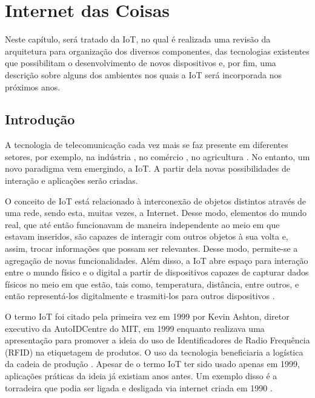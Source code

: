 \chapter{Internet das Coisas}
\label{cap:internet_of_things}

Neste capítulo, será tratado da IoT, no qual é realizada uma revisão da arquitetura para organização dos diversos componentes, das tecnologias existentes que possibilitam o desenvolvimento de novos dispositivos e, por fim, uma descrição sobre alguns dos ambientes nos quais a IoT será incorporada nos próximos anos.

\section{Introdução}

A tecnologia de telecomunicação cada vez mais se faz presente em diferentes setores, por exemplo, na indústria \cite{Fernandes2013}, no comércio \cite{Carmona2014}, no agricultura \cite{Quadros2011}. No entanto, um novo paradigma vem emergindo, a IoT. A partir dela novas possibilidades de interação e aplicações serão criadas.


O conceito de IoT está relacionado à interconexão de objetos distintos através de uma rede, sendo esta, muitas vezes, a Internet. Desse modo, elementos do mundo real, que até então funcionavam de maneira independente ao meio em que estavam inseridos, são capazes de interagir com outros objetos à sua volta e, assim, trocar informações que possam ser relevantes. Desse modo, permite-se a agregação de novas funcionalidades. Além disso, a IoT abre espaço para interação entre o mundo físico e o digital a partir de dispositivos capazes de capturar dados físicos no meio em que estão, tais como, temperatura, distância, entre outros, e então representá-los digitalmente e trasmiti-los para outros dispositivos \cite{Suresh2014}.

O termo IoT foi citado pela primeira vez em 1999 por Kevin Ashton, diretor executivo da AutoIDCentre do MIT, em 1999 enquanto realizava uma apresentação para promover a ideia do uso de Identificadores de Radio Frequência (RFID) na etiquetagem de produtos. O uso da tecnologia beneficiaria a logística da cadeia de produção \cite{Finep2015}. Apesar de o termo IoT ter sido usado apenas em 1999, aplicações práticas da ideia já existiam anos antes. Um exemplo disso é a torradeira que podia ser ligada e desligada via internet criada em 1990 \cite{Suresh2014}.

